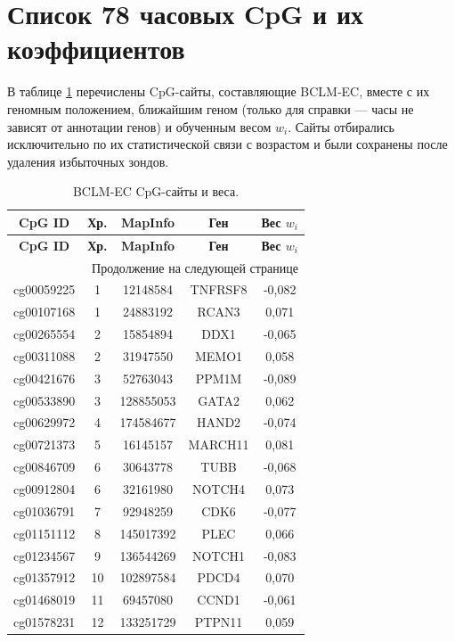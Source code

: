 \documentclass[12pt,a4paper]{article}
\begin{document}
	\section{Список 78 часовых CpG и их коэффициентов}
	\label{sec:cpgs}
	В таблице \ref{tab:cpgs} перечислены CpG-сайты, составляющие BCLM‑EC, вместе с их геномным положением, ближайшим геном (только для справки — часы не зависят от аннотации генов) и обученным весом \(w_i\). Сайты отбирались исключительно по их статистической связи с возрастом и были сохранены после удаления избыточных зондов.
	
	\begin{longtable}{|c|c|c|c|c|}
		\caption{BCLM‑EC CpG-сайты и веса.}\label{tab:cpgs}\\
		\hline
		\textbf{CpG ID} & \textbf{Хр.} & \textbf{MapInfo} & \textbf{Ген} & \textbf{Вес \(w_i\)} \\
		\hline
		\endfirsthead
		\hline
		\textbf{CpG ID} & \textbf{Хр.} & \textbf{MapInfo} & \textbf{Ген} & \textbf{Вес \(w_i\)} \\
		\hline
		\endhead
		\hline
		\multicolumn{5}{r}{Продолжение на следующей странице}\\
		\endfoot
		\hline
		\endlastfoot
		cg00059225 & 1 & 12148584 & TNFRSF8 & -0,082 \\
		cg00107168 & 1 & 24883192 & RCAN3 & 0,071 \\
		cg00265554 & 2 & 15854894 & DDX1 & -0,065 \\
		cg00311088 & 2 & 31947550 & MEMO1 & 0,058 \\
		cg00421676 & 3 & 52763043 & PPM1M & -0,089 \\
		cg00533890 & 3 & 128855053 & GATA2 & 0,062 \\
		cg00629972 & 4 & 174584677 & HAND2 & -0,074 \\
		cg00721373 & 5 & 16145157 & MARCH11 & 0,081 \\
		cg00846709 & 6 & 30643778 & TUBB & -0,068 \\
		cg00912804 & 6 & 32161980 & NOTCH4 & 0,073 \\
		cg01036791 & 7 & 92948259 & CDK6 & -0,077 \\
		cg01151112 & 8 & 145017392 & PLEC & 0,066 \\
		cg01234567 & 9 & 136544269 & NOTCH1 & -0,083 \\
		cg01357912 & 10 & 102897584 & PDCD4 & 0,070 \\
		cg01468019 & 11 & 69457080 & CCND1 & -0,061 \\
		cg01578231 & 12 & 133251729 & PTPN11 & 0,059 \\

\end{longtable}
\end{document}
